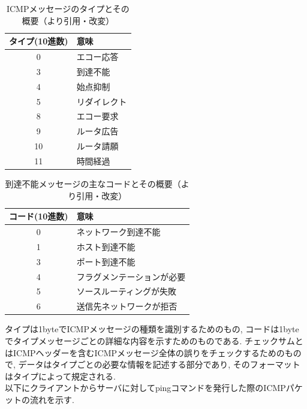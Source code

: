 \begin{enumerate}[label=\arabic*.]
        \begin{table}[htbp]
            \centering
            \caption{ICMPメッセージのタイプとその概要（\cite{nw_text_r08}より引用・改変）}
            \label{tab:icmp_msg_type}
            \begin{tabular}{|c|l|}
                \hline
                タイプ(10進数) & 意味 \\ \hline                
                0  & エコー応答 \\ \hline
                3  & 到達不能 \\ \hline
                4  & 始点抑制 \\ \hline
                5  & リダイレクト \\ \hline
                8  & エコー要求 \\ \hline               
                9  & ルータ広告 \\ \hline
                10 & ルータ請願 \\ \hline
                11 & 時間経過 \\ \hline       
            \end{tabular}
        \end{table}

        \begin{table}[htbp]
            \centering
            \caption{到達不能メッセージの主なコードとその概要（\cite{nw_text_r08}より引用・改変）}
            \label{tab:icmp_code}
            \begin{tabular}{|c|l|}
                \hline
                コード(10進数) & 意味 \\ \hline                
                0  & ネットワーク到達不能 \\ \hline
                1  & ホスト到達不能 \\ \hline
                3  & ポート到達不能 \\ \hline
                4  & フラグメンテーションが必要 \\ \hline
                5  & ソースルーティングが失敗 \\ \hline               
                6  & 送信先ネットワークが拒否 \\ \hline       
            \end{tabular}
        \end{table}

        タイプは1byteでICMPメッセージの種類を識別するためのもの, 
        コードは1byteでタイプメッセージごとの詳細な内容を示すためのものである.
        チェックサムとはICMPヘッダーを含むICMPメッセージ全体の誤りをチェックするためのもので,
        データはタイプごとの必要な情報を記述する部分であり, そのフォーマットはタイプによって規定される\cite{nw_text_r08}.
        \\
        \quad
        以下にクライアントからサーバに対してpingコマンドを発行した際のICMPパケットの流れを示す.


\end{enumerate}
